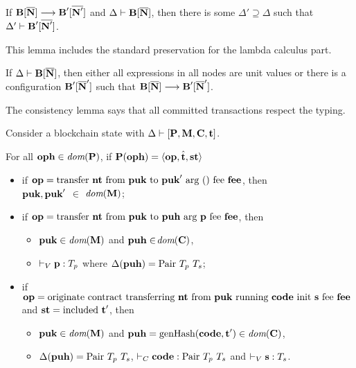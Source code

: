 \documentclass[runningheads]{llncs}
\begin{document}
\begin{lemma}[Preservation]
  If $\BLOCKCHAIN[\overline\NODE] \SystemTrans{} \BLOCKCHAIN'[\overline{\NODE'}]$ and
  $\JTypeConfig\Delta {\BLOCKCHAIN[\overline\NODE]}$, then there is some
  $\Delta' \supseteq \Delta$ such that
  $\JTypeConfig{\Delta'}{ \BLOCKCHAIN'[\overline{\NODE'}]}$.
\end{lemma}
This lemma includes the standard preservation for the lambda calculus part.
\begin{lemma}[Progress]
  If $\JTypeConfig\Delta{\BLOCKCHAIN[\overline\NODE]}$, then either
  all expressions in all nodes are unit values or there is a
  configuration $\BLOCKCHAIN'[\overline\NODE']$ such that
  $\BLOCKCHAIN[\overline\NODE] \SystemTrans \BLOCKCHAIN'[\overline\NODE']$.
\end{lemma}
The consistency lemma says that all committed transactions respect the
typing.
\begin{lemma}[Consistency]
Consider a blockchain state with $\JTypeBlockchain\Delta {[\PENDING, \MANAGERS, \CONTRACTORS,
\TIME]}$.

For all $\OPH\in\DOM (\PENDING)$,
if  $\PENDING (\OPH) =  \Angle{\OP, \hat\TIME, \STATUS}$
\begin{itemize}
\item if $\OP = \TRANSFER\NTEZ\PUK{\PUK'}\MTEZ$, then \\
  $\PUK, \PUK'$ $\in$ $\DOM (\MANAGERS)$;
\item if $\OP = \TRANSFER[\PARAMETER]\NTEZ\PUK\PUH\MTEZ$, then
  \begin{itemize}
  \item $\PUK \in \DOM (\MANAGERS)$ and $\PUH\in$$\DOM (\CONTRACTORS)$,
  \item $\JTypeValue\PARAMETER{ \TYPE_p}$ where $\Delta (\PUH)  =\TPAIR\ \TYPE_p\ \TYPE_s$;
  \end{itemize}
\item if $\OP = \ORIGINATE\NTEZ\PUK\CODE\STRING\MTEZ$ and $\STATUS =
  \STATUSINCLUDED\ \TIME'$, then
  \begin{itemize}
  \item $\PUK \in \DOM (\MANAGERS)$ and  $\PUH =\GENERATEHASH (\CODE, \TIME') \in \DOM (\CONTRACTORS)$,
  \item $\Delta (\PUH)  =\TPAIR\ \TYPE_p\ \TYPE_s$,  $\JTypeCode\CODE{
      \TPAIR\ \TYPE_p\ \TYPE_s}$ and $\JTypeValue\STRING{ \TYPE_s}$.
  \end{itemize}
\end{itemize}
\end{lemma}
\end{document}
